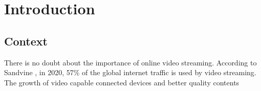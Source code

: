 \chapter{Introduction}
\label{chap:introduction}

\section{Context}
\label{sec:context}


There is no doubt about the importance of online video streaming.
According to Sandvine \cite{sandvine1},
in 2020, 57\% of the global internet traffic is used by video streaming.
The growth of video capable connected devices and better quality contents


